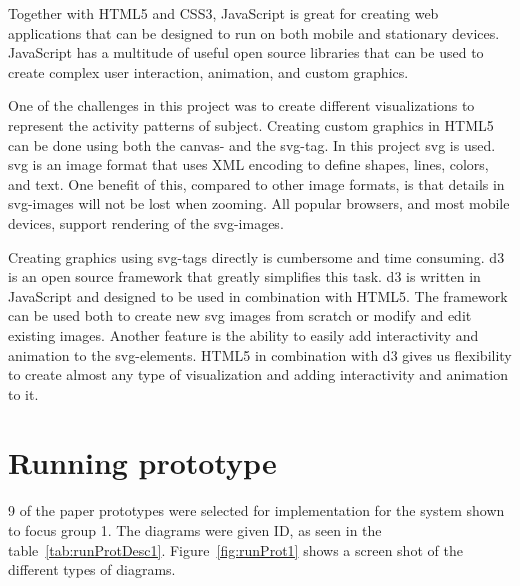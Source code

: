Together with HTML5 and CSS3, JavaScript is great for creating web applications that can be designed to run on both mobile and stationary devices. JavaScript has a multitude of useful open source libraries that can be used to create complex user interaction, animation, and custom graphics.

One of the challenges in this project was to create different visualizations to represent the activity patterns of subject. Creating custom graphics in HTML5 can be done using both the canvas- and the svg-tag. In this project \gls{svg} is used. \gls{svg} is an image format that uses XML encoding to define shapes, lines, colors, and text. One benefit of this, compared to other image formats, is that details in \gls{svg}-images will not be lost when zooming. All popular browsers, and most mobile devices, support rendering of the \gls{svg}-images.

Creating graphics using svg-tags directly is cumbersome and time consuming. \gls{d3} is an open source framework that greatly simplifies this task. \gls{d3} is written in JavaScript and designed to be used in combination with HTML5. The framework can be used both to create new \gls{svg} images from scratch or modify and edit existing images. Another feature is the ability to easily add interactivity and animation to the \gls{svg}-elements. HTML5 in combination with \gls{d3} gives us flexibility to create almost any type of visualization and adding interactivity and animation to it.

\section{Running prototype}
9 of the paper prototypes were selected for implementation for the system shown to focus group 1. The diagrams were given ID, as seen in the table~\ref{tab:runProtDesc1}. Figure~\ref{fig:runProt1} shows a screen shot of the different types of diagrams. 

